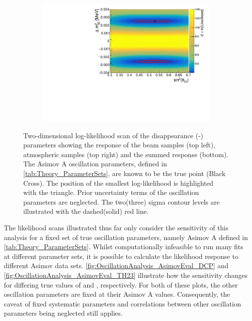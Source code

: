 \begin{figure}[h]
\begin{subfigure}[t]{1.0\textwidth}
    \includegraphics[width=\textwidth, trim={0mm 0mm 0mm 0mm}, clip,page=3]{Figures/OA/DisappearanceScans.pdf}
  \end{subfigure}
  \caption{Two-dimensional log-likelihood scan of the disappearance (-) parameters showing the response of the beam samples (top left), atmospheric samples (top right) and the summed response (bottom). The Asimov A oscillation parameters, defined in \autoref{tab:Theory_ParameterSets}, are known to be the true point (Black Cross). The position of the smallest log-likelihood is highlighted with the triangle. Prior uncertainty terms of the oscillation parameters are neglected. The two(three) sigma contour levels are illustrated with the dashed(solid) red line.}
  \label{fig:OscillationAnalysis_2DLLHOscScans_Dis}
\end{figure}

\clearpage

The likelihood scans illustrated thus far only consider the sensitivity of this analysis for a fixed set of true oscillation parameters, namely Asimov A defined in \autoref{tab:Theory_ParameterSets}. Whilst computationally infeasible to run many fits at different parameter sets, it is possible to calculate the likelihood response to different Asimov data sets. \autoref{fig:OscillationAnalysis_AsimovEval_DCP} and \autoref{fig:OscillationAnalysis_AsimovEval_TH23} illustrate how the sensitivity changes for differing true values of  and , respectively. For both of these plots, the other oscillation parameters are fixed at their Asimov A values. Consequently, the caveat of fixed systematic parameters and correlations between other oscillation parameters being neglected still applies.

